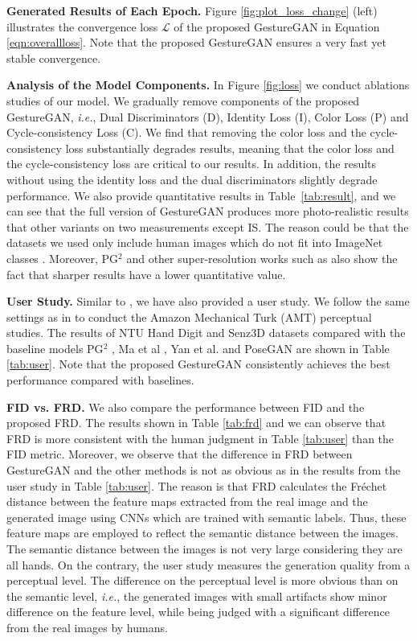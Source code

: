 \documentclass[sigconf]{acmart}
\begin{document}
\noindent \textbf{Generated Results of Each Epoch.}
Figure \ref{fig:plot_loss_change} (left) illustrates the convergence loss $\mathcal{L}$ of the proposed GestureGAN in Equation \ref{eqn:overallloss}. 
Note that the proposed GestureGAN ensures a very fast yet stable convergence.

\noindent \textbf{Analysis of the Model Components.}
In Figure \ref{fig:loss} we conduct ablations studies of our model.
We gradually remove components of the proposed GestureGAN, \textit{i.e.}, Dual Discriminators (D), Identity Loss (I), Color Loss (P) and Cycle-consistency Loss (C).
We find that removing the color loss and the cycle-consistency loss substantially degrades results, meaning that the color loss and the cycle-consistency loss are critical to our results.
In addition, the results without using the identity loss and the dual discriminators slightly degrade performance.
We also provide quantitative results in Table~\ref{tab:result}, and we can see that the full version of GestureGAN  produces more photo-realistic results that other variants on two measurements except IS.
The reason could be that the datasets we used only include human images which do not fit into ImageNet classes \cite{deng2009imagenet}. 
Moreover, PG$^2$ \cite{ma2017pose} and other super-resolution works such as \cite{johnson2016perceptual}  also show the fact that sharper results have a lower quantitative value.

\noindent \textbf{User Study.}
Similar to \cite{ma2017pose,zhu2017unpaired,siarohin2017deformable}, we have also provided a user study. 
We follow the same settings as in \cite{isola2017image} to conduct the Amazon Mechanical Turk (AMT) perceptual studies.
The results of  NTU Hand Digit \cite{liu2016deepfashion} and Senz3D \cite{memo2016head} datasets compared with the baseline models PG$^2$ \protect\cite{ma2017pose}, Ma et al \cite{ma2017disentangled}, Yan et al. \cite{yan2017skeleton} and PoseGAN \cite{siarohin2017deformable} are shown in Table \ref{tab:user}.
Note that the proposed GestureGAN consistently achieves the best performance compared with baselines.  

\noindent \textbf{FID vs. FRD.}
We also compare the performance between FID and the proposed FRD.
The results shown in Table \ref{tab:frd} and we can observe that FRD is more consistent with the human judgment in Table \ref{tab:user} than the FID metric.
Moreover, we observe that the difference in FRD between GestureGAN and the other methods is not as obvious as in the results from the user study in Table \ref{tab:user}.
The reason is that FRD calculates the Fr\'echet distance between the feature maps extracted from the real image and the generated image using CNNs which are trained with semantic labels. Thus, these feature maps are employed to reflect the semantic distance between the images. The semantic distance between the images is not very large considering they are all hands. On the contrary, the user study measures the generation quality from a perceptual level. The difference on the perceptual level is more obvious than on the semantic level, \emph{i.e.}, the generated images with small artifacts show minor difference on the feature level, while being judged with a significant difference from the real images by humans. 
\end{document}
